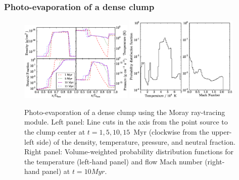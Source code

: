 \subsubsection{Photo-evaporation of a dense clump}
\label{sec.tests.raytracing}

\begin{figure}
  \centering
  \includegraphics[width=0.48\textwidth]{figures/shadowing-rays.eps}
  \hfill
  \includegraphics[width=0.48\textwidth]{figures/shadowing-pdf.eps}
  \caption{Photo-evaporation of a dense clump using the Moray
    ray-tracing module.  Left panel: Line cuts in the axis from the
    point source to the clump center at $t = 1, 5, 10, 15$~Myr
    (clockwise from the upper-left side) of the density, temperature,
    pressure, and neutral fraction.  Right panel: Volume-weighted
    probability distribution functions for the temperature (left-hand
    panel) and flow Mach number (right-hand panel) at $t = 10
    \unit{Myr}$.}
  \label{fig:shadowing1}
\end{figure}

